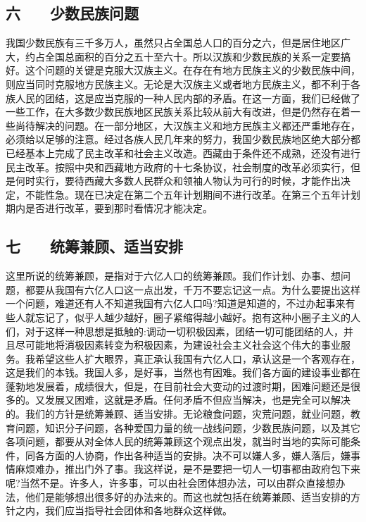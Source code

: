 \documentclass[cn,11pt,chinese]{elegantbook}
\def\myformat#1{\hfil\hfil #1}
\begin{document}
\subsection*{\myformat{六　　少数民族问题}}
我国少数民族有三千多万人，虽然只占全国总人口的百分之六，但是居住地区广大，约占全国总面积的百分之五十至六十。所以汉族和少数民族的关系一定要搞好。这个问题的关键是克服大汉族主义。在存在有地方民族主义的少数民族中间，则应当同时克服地方民族主义。无论是大汉族主义或者地方民族主义，都不利于各族人民的团结，这是应当克服的一种人民内部的矛盾。在这一方面，我们已经做了一些工作，在大多数少数民族地区民族关系比较从前大有改进，但是仍然存在着一些尚待解决的问题。在一部分地区，大汉族主义和地方民族主义都还严重地存在，必须给以足够的注意。经过各族人民几年来的努力，我国少数民族地区绝大部分都已经基本上完成了民主改革和社会主义改造。西藏由于条件还不成熟，还没有进行民主改革。按照中央和西藏地方政府的十七条协议，社会制度的改革必须实行，但是何时实行，要待西藏大多数人民群众和领袖人物认为可行的时候，才能作出决定，不能性急。现在已决定在第二个五年计划期间不进行改革。在第三个五年计划期内是否进行改革，要到那时看情况才能决定。\\
\subsection*{\myformat{七　　统筹兼顾、适当安排}}
这里所说的统筹兼顾，是指对于六亿人口的统筹兼顾。我们作计划、办事、想问题，都要从我国有六亿人口这一点出发，千万不要忘记这一点。为什么要提出这样一个问题，难道还有人不知道我国有六亿人口吗?知道是知道的，不过办起事来有些人就忘记了，似乎人越少越好，圈子紧缩得越小越好。抱有这种小圈子主义的人们，对于这样一种思想是抵触的:调动一切积极因素，团结一切可能团结的人，并且尽可能地将消极因素转变为积极因素，为建设社会主义社会这个伟大的事业服务。我希望这些人扩大眼界，真正承认我国有六亿人口，承认这是一个客观存在，这是我们的本钱。我国人多，是好事，当然也有困难。我们各方面的建设事业都在蓬勃地发展着，成绩很大，但是，在目前社会大变动的过渡时期，困难问题还是很多的。又发展又困难，这就是矛盾。任何矛盾不但应当解决，也是完全可以解决的。我们的方针是统筹兼顾、适当安排。无论粮食问题，灾荒问题，就业问题，教育问题，知识分子问题，各种爱国力量的统一战线问题，少数民族问题，以及其它各项问题，都要从对全体人民的统筹兼顾这个观点出发，就当时当地的实际可能条件，同各方面的人协商，作出各种适当的安排。决不可以嫌人多，嫌人落后，嫌事情麻烦难办，推出门外了事。我这样说，是不是要把一切人一切事都由政府包下来呢?当然不是。许多人，许多事，可以由社会团体想办法，可以由群众直接想办法，他们是能够想出很多好的办法来的。而这也就包括在统筹兼顾、适当安排的方针之内，我们应当指导社会团体和各地群众这样做。\\
\end{document}
